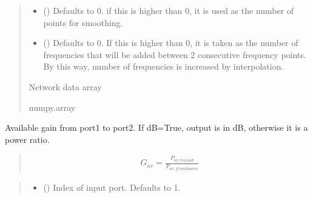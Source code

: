 \documentclass[letterpaper,10pt,english]{sphinxmanual}
\begin{document}
\begin{fulllineitems}
\begin{fulllineitems}
\begin{quote}
\begin{description}
\begin{itemize}
\item {} 
\sphinxAtStartPar
{} (\sphinxstyleliteralemphasis{\sphinxupquote{, }}) \textendash{} Defaults to 0. if this is higher than 0, it is used as the number of points for smoothing.

\item {} 
\sphinxAtStartPar
{} (\sphinxstyleliteralemphasis{\sphinxupquote{, }}) \textendash{} Defaults to 0. If this is higher than 0, it is taken as the number of frequencies that will be added between 2 consecutive frequency points. By this way, number of frequencies is increased by interpolation.

\end{itemize}

\sphinxAtStartPar
Network data array

\sphinxAtStartPar
numpy.array

\end{description}\end{quote}

\end{fulllineitems}


\begin{fulllineitems}
\label{\detokenize{touchstone:touchstone.spfile.gav}}
\pysigstartsignatures
{}
\pysigstopsignatures
\sphinxAtStartPar
Available gain from port1 to port2. If dB=True, output is in dB, otherwise it is a power ratio.
\begin{quote}
\begin{equation*}
\begin{split}G_{av}=\frac{P_{av,toLoad}}{P_{av,fromSource}}\end{split}
\end{equation*}\end{quote}
\begin{quote}\begin{description}
\begin{itemize}
\item {} 
\sphinxAtStartPar
{} (\sphinxstyleliteralemphasis{\sphinxupquote{, }}) \textendash{} Index of input port. Defaults to 1.


\end{itemize}
\end{description}
\end{quote}
\end{fulllineitems}
\end{fulllineitems}
\end{document}
